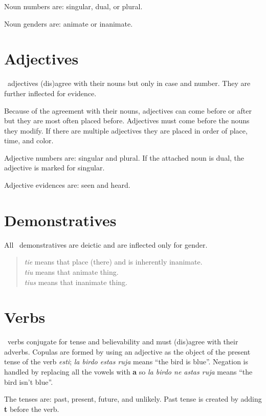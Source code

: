 Noun numbers are: singular, dual, or plural.

Noun genders are: animate or inanimate.

\section{Adjectives}

\LanguageName\ adjectives (dis)agree with their nouns but only in case and number.
They are further inflected for evidence.

Because of the agreement with their nouns, adjectives can come before or after but they are most often placed before.
Adjectives must come before the nouns they modify.
If there are multiple adjectives they are placed in order of place, time, and color.

Adjective numbers are: singular and plural.
If the attached noun is dual, the adjective is marked for singular.

Adjective evidences are: seen and heard.

\section{Demonstratives}

All \LanguageName\ demonstratives are deictic and are inflected only for gender.

\begin{quote}
\textit{tie} means that place (there) and is inherently inanimate.\\
\textit{tiu} means that animate thing.\\
\textit{tius} means that inanimate thing.\\
\end{quote}

\section{Verbs}

\LanguageName\ verbs conjugate for tense and believability and must (dis)agree with their adverbs.
Copulas are formed by using an adjective as the object of the present tense of the verb \textit{esti};
\textit{la birdo estas ruja} means ``the bird is blue''.
Negation is handled by replacing all the vowels with \textbf{a} so \textit{la birdo ne astas ruja} means ``the bird isn't blue''.

The tenses are: past, present, future, and unlikely.
Past tense is created by adding \textbf{t} before the verb.

